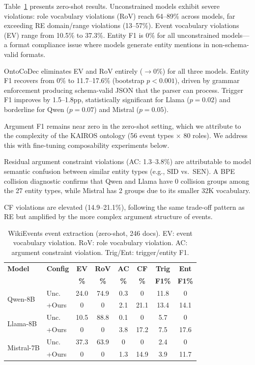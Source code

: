 \documentclass[11pt]{article}
\begin{document}
Table~\ref{tab:ee_zs} presents zero-shot results.
Unconstrained models exhibit severe violations: role vocabulary violations (RoV) reach 64--89\% across models, far exceeding RE domain/range violations (13--57\%).
Event vocabulary violations (EV) range from 10.5\% to 37.3\%.
Entity F1 is 0\% for all unconstrained models---a format compliance issue where models generate entity mentions in non-schema-valid formats.

OntoCoDec eliminates EV and RoV entirely ($\to$0\%) for all three models.
Entity F1 recovers from 0\% to 11.7--17.6\% (bootstrap $p<0.001$), driven by grammar enforcement producing schema-valid JSON that the parser can process.
Trigger F1 improves by 1.5--1.8pp, statistically significant for Llama ($p=0.02$) and borderline for Qwen ($p=0.07$) and Mistral ($p=0.05$).

Argument F1 remains near zero in the zero-shot setting, which we attribute to the complexity of the KAIROS ontology (56 event types $\times$ 80 roles).
We address this with fine-tuning composability experiments below.

Residual argument constraint violations (AC: 1.3--3.8\%) are attributable to model semantic confusion between similar entity types (e.g., SID vs.\ SEN).
A BPE collision diagnostic confirms that Qwen and Llama have 0 collision groups among the 27 entity types, while Mistral has 2 groups due to its smaller 32K vocabulary.

CF violations are elevated (14.9--21.1\%), following the same trade-off pattern as RE but amplified by the more complex argument structure of events.

\begin{table}[t]
\centering
\small
\setlength{\tabcolsep}{3pt}
\begin{tabular}{@{}llcccccc@{}}
\toprule
\textbf{Model} & \textbf{Config} & \textbf{EV} & \textbf{RoV} & \textbf{AC} & \textbf{CF} & \textbf{Trig} & \textbf{Ent} \\
& & \textbf{\%} & \textbf{\%} & \textbf{\%} & \textbf{\%} & \textbf{F1\%} & \textbf{F1\%} \\
\midrule
\multirow{2}{*}{Qwen-8B}
& Unc. & 24.0 & 74.9 & 0.3 & 0 & 11.8 & 0 \\
& +Ours & 0 & 0 & 2.1 & 21.1 & 13.4 & 14.1 \\
\midrule
\multirow{2}{*}{Llama-8B}
& Unc. & 10.5 & 88.8 & 0.1 & 0 & 5.7 & 0 \\
& +Ours & 0 & 0 & 3.8 & 17.2 & 7.5 & 17.6 \\
\midrule
\multirow{2}{*}{Mistral-7B}
& Unc. & 37.3 & 63.9 & 0 & 0 & 2.4 & 0 \\
& +Ours & 0 & 0 & 1.3 & 14.9 & 3.9 & 11.7 \\
\bottomrule
\end{tabular}
\caption{WikiEvents event extraction (zero-shot, 246 docs). EV: event vocabulary violation. RoV: role vocabulary violation. AC: argument constraint violation. Trig/Ent: trigger/entity F1.}
\label{tab:ee_zs}
\end{table}
\end{document}
